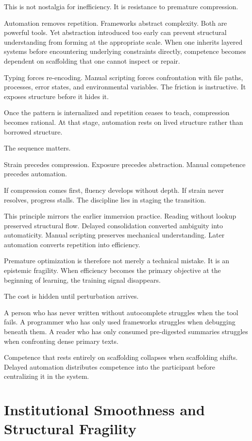 \documentclass[12pt]{article}
\begin{document}
This is not nostalgia for inefficiency. It is resistance to premature compression.

Automation removes repetition. Frameworks abstract complexity. Both are powerful tools. Yet abstraction introduced too early can prevent structural understanding from forming at the appropriate scale. When one inherits layered systems before encountering underlying constraints directly, competence becomes dependent on scaffolding that one cannot inspect or repair.

Typing forces re-encoding. Manual scripting forces confrontation with file paths, processes, error states, and environmental variables. The friction is instructive. It exposes structure before it hides it.

Once the pattern is internalized and repetition ceases to teach, compression becomes rational. At that stage, automation rests on lived structure rather than borrowed structure.

The sequence matters.

Strain precedes compression. Exposure precedes abstraction. Manual competence precedes automation.

If compression comes first, fluency develops without depth. If strain never resolves, progress stalls. The discipline lies in staging the transition.

This principle mirrors the earlier immersion practice. Reading without lookup preserved structural flow. Delayed consolidation converted ambiguity into automaticity. Manual scripting preserves mechanical understanding. Later automation converts repetition into efficiency.

Premature optimization is therefore not merely a technical mistake. It is an epistemic fragility. When efficiency becomes the primary objective at the beginning of learning, the training signal disappears.

The cost is hidden until perturbation arrives.

A person who has never written without autocomplete struggles when the tool fails. A programmer who has only used frameworks struggles when debugging beneath them. A reader who has only consumed pre-digested summaries struggles when confronting dense primary texts.

Competence that rests entirely on scaffolding collapses when scaffolding shifts. Delayed automation distributes competence into the participant before centralizing it in the system.

\section*{Institutional Smoothness and Structural Fragility}
\end{document}
